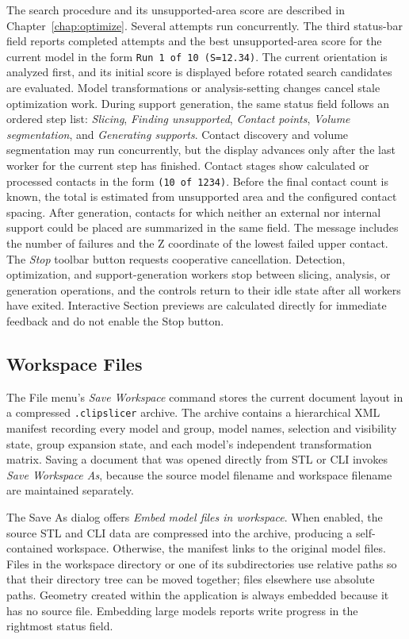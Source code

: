 The search procedure and its unsupported-area score are described in
Chapter~\ref{chap:optimize}. Several attempts run concurrently. The third
status-bar field reports
completed attempts and the best unsupported-area score for the current model
in the form \texttt{Run 1 of 10 (S=12.34)}. The current orientation is analyzed
first, and its initial score is displayed before rotated search candidates are
evaluated. Model transformations or analysis-setting changes cancel stale
optimization work.
During support generation, the same status field follows an ordered step list:
\emph{Slicing}, \emph{Finding unsupported}, \emph{Contact points},
\emph{Volume segmentation}, and \emph{Generating supports}. Contact discovery
and volume segmentation may run concurrently, but the display advances only
after the last worker for the current step has finished. Contact stages show
calculated or processed contacts in the form \texttt{(10 of 1234)}. Before the
final contact count is known, the total is estimated from unsupported area and
the configured contact spacing.
After generation, contacts for which neither an external nor internal support
could be placed are summarized in the same field. The message includes the
number of failures and the Z coordinate of the lowest failed upper contact.
The \emph{Stop} toolbar button requests cooperative cancellation. Detection,
optimization, and support-generation workers stop between slicing, analysis,
or generation operations, and the controls return to their idle state after
all workers have exited. Interactive Section previews are calculated directly
for immediate feedback and do not enable the Stop button.

\subsection{Workspace Files}
\label{workspace-files}

The File menu's \emph{Save Workspace} command stores the current document
layout in a compressed \texttt{.clipslicer} archive. The archive contains a hierarchical
XML manifest recording every model and group, model names, selection and
visibility state, group expansion state, and each model's independent
transformation matrix. Saving a document that was opened directly from STL or
CLI invokes \emph{Save Workspace As}, because the source model filename and
workspace filename are maintained separately.

The Save As dialog offers \emph{Embed model files in workspace}. When enabled,
the source STL and CLI data are compressed into the archive, producing a
self-contained workspace. Otherwise, the manifest links to the original model
files. Files in the workspace directory or one of its subdirectories use
relative paths so that their directory tree can be moved together; files
elsewhere use absolute paths. Geometry created within the application is always
embedded because it has no source file. Embedding large models reports write
progress in the rightmost status field.

